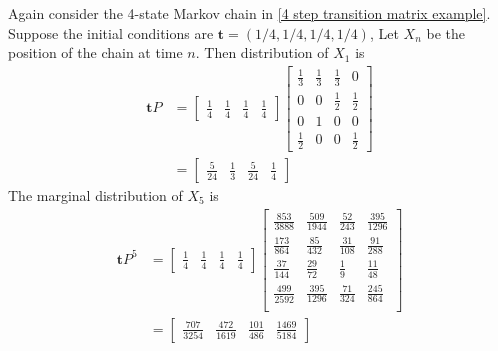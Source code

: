 \begin{example}
    Again consider the 4-state Markov chain in \cref{4 step transition matrix example}. 
    Suppose the initial conditions are $ \mathbf{t} = (1/4,1/4,1/4,1/4) $, Let $ X_{n} $ be the position of the chain at time $ n $. 
    Then distribution of  $ X_{1} $ is
    \begin{align*}
        \mathbf{t}P &= \begin{bmatrix} \frac{1}{4} & \frac{1}{4} & \frac{1}{4} & \frac{1}{4} \end{bmatrix} 
        \begin{bmatrix}
            \frac{1}{3} & \frac{1}{3} & \frac{1}{3} & 0 \\
            0 & 0 & \frac{1}{2} & \frac{1}{2} \\ 
            0 & 1 & 0 & 0 \\ 
            \frac{1}{2} & 0 & 0 & \frac{1}{2} 
        \end{bmatrix}\\
                    &= \begin{bmatrix} \frac{5}{24} & \frac{1}{3} & \frac{5}{24} & \frac{1}{4} \end{bmatrix} 
    \end{align*}
    The marginal distribution of $ X_{5} $ is 
    \begin{align*}
        \mathbf{t}P^{5} &= \begin{bmatrix} \frac{1}{4} & \frac{1}{4} & \frac{1}{4} & \frac{1}{4} \end{bmatrix}
        \begin{bmatrix}
            \frac{853}{3888} & \frac{509}{1944} & \frac{52}{243} & \frac{395}{1296} \\
            \frac{173}{864} & \frac{85}{432} & \frac{31}{108} & \frac{91}{288} \\
            \frac{37}{144} & \frac{29}{72} & \frac{1}{9} & \frac{11}{48} \\
            \frac{499}{2592} & \frac{395}{1296} & \frac{71}{324} & \frac{245}{864} \\
        \end{bmatrix}\\
                        &= \begin{bmatrix}
                            \frac{707}{3254} & \frac{472}{1619} & \frac{101}{486} & \frac{1469}{5184}
                        \end{bmatrix} \\
    \end{align*}
\end{example}
